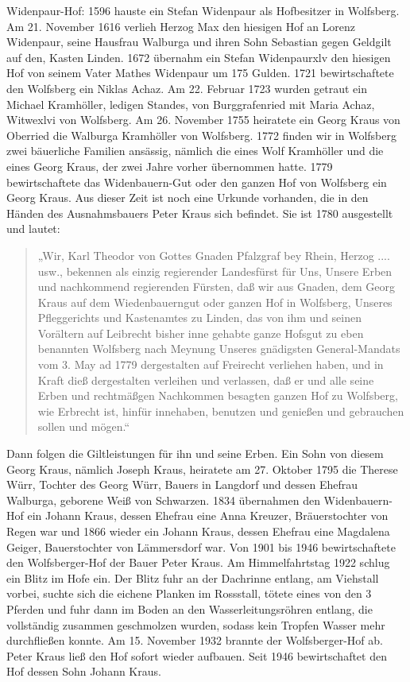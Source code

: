 \documentclass[12pt,a4pager,draft]{book}
\begin{document}
Widenpaur-Hof: 1596 hauste ein Stefan Widenpaur als Hofbesitzer in Wolfsberg. Am
21. November 1616 verlieh Herzog Max den hiesigen Hof an Lorenz Widenpaur, seine
Hausfrau Walburga und ihren Sohn Sebastian gegen Geldgilt auf den, Kasten
Linden. 1672 übernahm ein Stefan Widenpaurxlv den hiesigen Hof von seinem Vater
Mathes Widenpaur um 175 Gulden. 1721 bewirtschaftete den Wolfsberg ein Niklas
Achaz. Am 22. Februar 1723 wurden getraut ein Michael Kramhöller, ledigen
Standes, von Burggrafenried mit Maria Achaz, Witwexlvi von Wolfsberg. Am 26.
November 1755 heiratete ein Georg Kraus von Oberried die Walburga Kramhöller von
Wolfsberg. 1772 finden wir in Wolfsberg zwei bäuerliche Familien ansässig,
nämlich die eines Wolf Kramhöller und die eines Georg Kraus, der zwei Jahre
vorher übernommen hatte. 1779 bewirtschaftete das Widenbauern-Gut oder den
ganzen Hof von Wolfsberg ein Georg Kraus. Aus dieser Zeit ist noch eine Urkunde
vorhanden, die in den Händen des Ausnahmsbauers Peter Kraus sich befindet. Sie
ist 1780 ausgestellt und lautet:

\begin{quote}
„Wir, Karl Theodor von Gottes Gnaden Pfalzgraf bey Rhein, Herzog .... usw.,
bekennen als einzig regierender Landesfürst für Uns, Unsere Erben und
nachkommend regierenden Fürsten, daß wir aus Gnaden, dem Georg Kraus auf dem
Wiedenbauerngut oder ganzen Hof in Wolfsberg, Unseres Pfleggerichts und
Kastenamtes zu Linden, das von ihm und seinen Vorältern auf Leibrecht bisher
inne gehabte ganze Hofsgut zu eben benannten Wolfsberg nach Meynung Unseres
gnädigsten General-Mandats vom 3. May ad 1779 dergestalten auf Freirecht
verliehen haben, und in Kraft dieß dergestalten verleihen und verlassen, daß er
und alle seine Erben und rechtmäßgen Nachkommen besagten ganzen Hof zu
Wolfsberg, wie Erbrecht ist, hinfür innehaben, benutzen und genießen und
gebrauchen sollen und mögen.“
\end{quote}

Dann folgen die Giltleistungen für ihn und seine Erben. Ein Sohn von diesem
Georg Kraus, nämlich Joseph Kraus, heiratete am 27. Oktober 1795 die Therese
Würr, Tochter des Georg Würr, Bauers in Langdorf und dessen Ehefrau Walburga,
geborene Weiß von Schwarzen. 1834 übernahmen den Widenbauern-Hof ein Johann
Kraus, dessen Ehefrau eine Anna Kreuzer, Bräuerstochter von Regen war und 1866
wieder ein Johann Kraus, dessen Ehefrau eine Magdalena Geiger, Bauerstochter von
Lämmersdorf war. Von 1901 bis 1946 bewirtschaftete den Wolfsberger-Hof der Bauer
Peter Kraus. Am Himmelfahrtstag 1922 schlug ein Blitz im Hofe ein. Der Blitz
fuhr an der Dachrinne entlang, am Viehstall vorbei, suchte sich die eichene
Planken im Rossstall, tötete eines von den 3 Pferden und fuhr dann im Boden an
den Wasserleitungsröhren entlang, die vollständig zusammen geschmolzen wurden,
sodass kein Tropfen Wasser mehr durchfließen konnte. Am 15. November 1932
brannte der Wolfsberger-Hof ab. Peter Kraus ließ den Hof sofort wieder aufbauen.
Seit 1946 bewirtschaftet den Hof dessen Sohn Johann Kraus.
\end{document}
